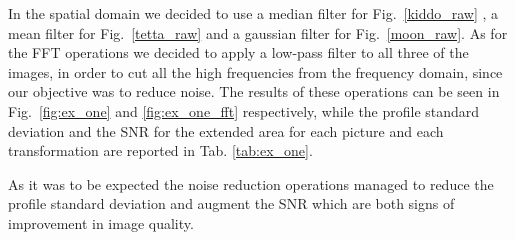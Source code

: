 \documentclass[a4paper]{article}
\begin{document}
In the spatial domain we decided to use a median filter for Fig.~\ref{kiddo_raw} , a mean filter for Fig.~\ref{tetta_raw} and a gaussian filter for Fig.~\ref{moon_raw}. As for the FFT operations we decided to apply a low-pass filter to all three of the images, in order to cut all the high frequencies from the frequency domain, since our objective was to reduce noise. The results of these operations can be seen in Fig.~\ref{fig:ex_one} and \ref{fig:ex_one_fft} respectively, while the profile standard deviation and the SNR for the extended area for each picture and each transformation are reported in Tab. \ref{tab:ex_one}.

As it was to be expected the noise reduction operations managed to reduce the profile standard deviation and augment the SNR which are both signs of improvement in image quality.
\end{document}
